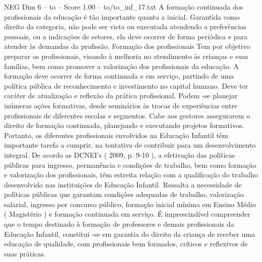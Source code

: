 \begin{textsample}{NEG Dim 6 – to – Score 1.00 – to/to\_inf\_17.txt}  \label{ex:f6_neg_114}
A formação continuada dos profissionais da educação é tão importante quanto a inicial.
Garantida como direito da categoria, não pode ser vista ou executada atendendo a preferências pessoais, ou a indicações de setores, ela deve ocorrer de forma periódica e para atender às demandas da profissão.
Formação dos profissionais Tem por objetivo preparar os profissionais, visando à melhoria no atendimento às crianças e suas famílias, bem como promover a valorização dos profissionais da educação.
A formação deve ocorrer de forma continuada e em serviço, partindo de uma política pública de reconhecimento e investimento no capital humano.
Deve ter caráter de atualização e reflexão da prática profissional.
Podem -se planejar inúmeras ações formativas, desde seminários às trocas de experiências entre profissionais de diferentes escolas e segmentos.
Cabe aos gestores assegurarem o direito de formação continuada, planejando e executando projetos formativos.
Portanto, os diferentes profissionais envolvidos na Educação Infantil têm importante tarefa a cumprir, na tentativa de contribuir para um desenvolvimento integral.
De acordo as DCNEI’s ( 2009, p. 9-10 ), a efetivação das políticas públicas para ingresso, permanência e condições de trabalho, bem como formação e valorização dos profissionais, têm estreita relação com a qualificação do trabalho desenvolvido nas instituições de Educação Infantil.
Ressalta a necessidade de políticas públicas que garantam condições adequadas de trabalho, valorização salarial, ingresso por concurso público, formação inicial mínima em Ensino Médio ( Magistério ) e formação continuada em serviço.
É imprescindível compreender que o tempo destinado à formação de professores e demais profissionais da Educação Infantil, constitui -se em garantia do direito da criança de receber uma educação de qualidade, com profissionais bem formados, críticos e reflexivos de suas práticas.

\end{textsample}
